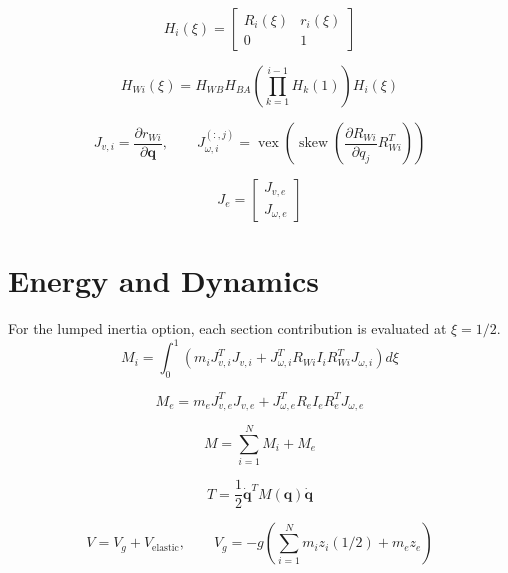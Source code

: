 \documentclass[11pt]{article}
\begin{document}
\begin{equation}
H_i(\xi)=\begin{bmatrix}R_i(\xi)&r_i(\xi)\\0&1\end{bmatrix}\label{eq:local-transform}
\end{equation}

\begin{equation}
H_{Wi}(\xi)=H_{WB}H_{BA}\left(\prod_{k=1}^{i-1}H_k(1)\right)H_i(\xi)
\end{equation}

\begin{equation}
J_{v,i}=\frac{\partial r_{Wi}}{\partial\boldsymbol q},\qquad J_{\omega,i}^{(:,j)}=\operatorname{vex}\!\left(\operatorname{skew}\!\left(\frac{\partial R_{Wi}}{\partial q_j}R_{Wi}^{T}\right)\right)
\end{equation}

\begin{equation}
J_e=\begin{bmatrix}J_{v,e}\\J_{\omega,e}\end{bmatrix}
\end{equation}


\section{Energy and Dynamics}
For the lumped inertia option, each section contribution is evaluated at $\xi=1/2$.
\begin{equation}
M_i=\int_0^1\!\left(m_iJ_{v,i}^{T}J_{v,i}+J_{\omega,i}^{T}R_{Wi}I_iR_{Wi}^{T}J_{\omega,i}\right)d\xi
\end{equation}

\begin{equation}
M_e=m_eJ_{v,e}^{T}J_{v,e}+J_{\omega,e}^{T}R_eI_eR_e^TJ_{\omega,e}
\end{equation}

\begin{equation}
M=\sum_{i=1}^{N}M_i+M_e\label{eq:mass-assembly}
\end{equation}

\begin{equation}
T=\frac12\dot{\boldsymbol q}^{T}M(\boldsymbol q)\dot{\boldsymbol q}
\end{equation}

\begin{equation}
V=V_g+V_{\mathrm{elastic}},\qquad V_g=-g\!\left(\sum_{i=1}^{N}m_i z_i(1/2)+m_ez_e\right)
\end{equation}
\end{document}

